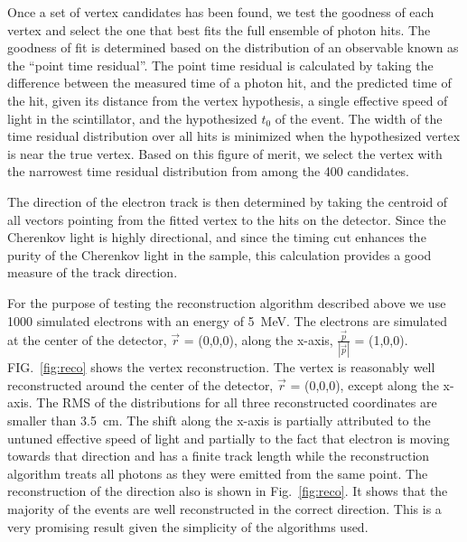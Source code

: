 \documentclass[aps,prc,twocolumn,groupedaddress,showpacs,amsmath,amssymb,floatfix,superscriptaddress]{revtex4}
\begin{document}
Once a set of vertex candidates has been found, we test the
goodness of each vertex and select the one that best fits the full
ensemble of photon hits. The goodness of fit is determined based on
the distribution of an observable known as the ``point time
residual''\cite{SuperKalgo}. The point time residual is calculated by
taking the difference between the measured time of a photon hit, and
the predicted time of the hit, given its distance from the vertex
hypothesis, a single effective speed of light in the scintillator, and the hypothesized $t_0$ of the event. The width
of the time residual distribution over all hits is minimized when the
hypothesized vertex is near the true vertex. Based on this figure of
merit, we select the vertex with the narrowest time residual
distribution from among the 400 candidates. 

The direction of the electron track is then determined by taking the
centroid of all vectors pointing from the fitted vertex to the hits on
the detector. Since the Cherenkov light is highly directional, and
since the timing cut enhances the purity of the Cherenkov light in the
sample, this calculation provides a good measure of the track
direction. 

For the purpose of testing the reconstruction algorithm described
above we use 1000 simulated electrons with an energy of 5~MeV. The
electrons are simulated at the center of the detector, $\vec{r}$ =
(0,0,0), along the x-axis, $\frac{\vec{p}}{|\vec{p}|}$ = (1,0,0). FIG.~\ref{fig:reco} shows the vertex reconstruction. The vertex is
reasonably well reconstructed around the center of the detector, $\vec{r}$
= (0,0,0), except along the x-axis. The RMS of the distributions for all three reconstructed
coordinates are smaller than 3.5~cm. The shift along the x-axis is
partially attributed to the untuned effective speed of light and partially to the fact that electron is moving towards that direction
and has a finite track length while the reconstruction algorithm
treats all photons as they were emitted from the same point.
The reconstruction of the direction also is shown in
Fig.~\ref{fig:reco}. It shows that the majority of the events are well reconstructed in the correct direction. This is a very promising result given the simplicity of the algorithms used.
\end{document}
